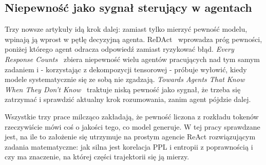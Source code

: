 \subsection{Niepewność jako sygnał sterujący w agentach}
\label{sec:agent-uncertainty}

Trzy nowsze artykuły idą krok dalej: zamiast tylko mierzyć pewność
modelu, wpinają ją wprost w pętlę decyzyjną agenta. ReDAct~\cite{redact2026}
wprowadza próg pewności, poniżej którego agent odracza odpowiedź
zamiast ryzykować błąd. \emph{Every Response Counts}~\cite{everyresponse2026}
zbiera niepewność wielu agentów pracujących nad tym samym zadaniem
i - korzystając z dekompozycji tensorowej - próbuje wyłowić, kiedy
modele systematycznie się ze sobą nie zgadzają. \emph{Towards
Agents That Know When They Don't Know}~\cite{towardsknow2025}
traktuje niską pewność jako sygnał, że trzeba się zatrzymać
i sprawdzić aktualny krok rozumowania, zanim agent pójdzie dalej.

Wszystkie trzy prace milcząco zakładają, że pewność liczona
z rozkładu tokenów rzeczywiście mówi coś o jakości tego, co model
generuje. W tej pracy sprawdzane jest, na ile to założenie się
utrzymuje na prostym agencie ReAct rozwiązującym zadania matematyczne:
jak silna jest korelacja PPL i entropii z poprawnością i czy ma
znaczenie, na której części trajektorii się ją mierzy.
